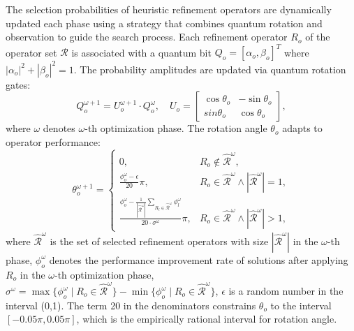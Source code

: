 \documentclass{IEEEtaes}
\begin{document}
The selection probabilities of heuristic refinement operators are dynamically updated each phase using a strategy that combines quantum rotation and observation to guide the search process. Each refinement operator $R_o$ of the operator set $\mathcal{R}$ is associated with a quantum bit $Q_o=\left[\alpha_o,\beta_o \right]^T$ where $\left|\alpha_o\right|^2+\left|\beta_o\right|^2=1$. The probability amplitudes are updated via quantum rotation gates:
\begin{equation}
Q_o^{\omega+1} = U_o^{\omega+1}\cdot Q_o^\omega,\quad U_o = \begin{bmatrix} \cos\theta_o & -\sin\theta_o \\sin\theta_o & \cos\theta_o \end{bmatrix},
\label{equ:qbit update}
\end{equation}
where $\omega$ denotes $\omega$-th optimization phase. The rotation angle $\theta_o$ adapts to operator performance:
\begin{equation}
    \theta_o^{\omega+1}=\begin{cases}
        0,&R_o \notin \hat{\mathcal{R}}^\omega,\\
        \frac{\phi_o^\omega-\epsilon}{20}\pi,&R_o\in\hat{\mathcal{R}}^\omega\wedge\left|\hat{\mathcal{R}}^\omega\right|=1,\\
        \frac{\phi_o^\omega-\frac{1}{\left|\hat{\mathcal{R}}^\omega\right|}\sum\limits_{R_l\in\hat{\mathcal{R}}^\omega}\phi_l^\omega }{20\cdot \sigma^\omega}\pi,&R_o\in\hat{\mathcal{R}}^\omega\wedge\left|\hat{\mathcal{R}}^\omega\right|>1,
    \end{cases}
\label{equ:theta}
\end{equation}
where $\hat{\mathcal{R}}^\omega$ is the set of selected refinement operators with size $\left|\hat{\mathcal{R}}^\omega\right|$ in the $\omega$-th phase, $\phi_o^\omega$  denotes the performance improvement rate of solutions after applying $R_o$ in the $\omega$-th optimization phase, $\sigma^\omega=\max\{\phi_o^\omega\mid R_o\in\hat{\mathcal{R}}^\omega\}-\min\{\phi_o^\omega\mid R_o\in\hat{\mathcal{R}}^\omega\}$, $\epsilon$ is a random number in the interval (0,1). The term 20 in the denominators constrains $\theta_o$ to the interval $[-0.05\pi,0.05\pi]$, which is the empirically rational interval for rotation angle.
\end{document}
